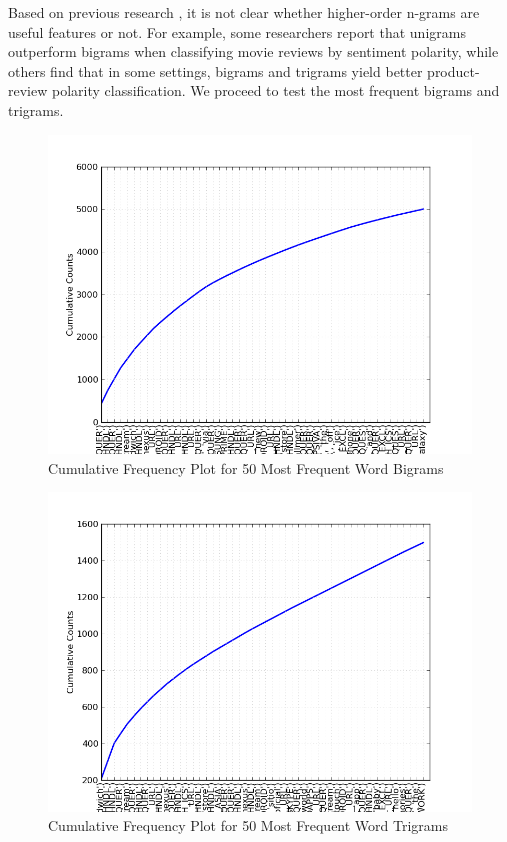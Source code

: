 Based on previous research \cite{survey}, it is not clear whether higher-order n-grams are useful features or not.
For example, some researchers report that unigrams outperform bigrams when classifying movie reviews by sentiment polarity,
while others find that in some settings, bigrams and trigrams yield better product-review polarity classification.
We proceed to test the most frequent bigrams and trigrams.

\begin{figure}[h]
\centering
\includegraphics[width=\textwidth]{img/fdist-bigrams.png}
\caption{Cumulative Frequency Plot for 50 Most Frequent Word Bigrams}
\label{fig:bigrams}
\end{figure}

\begin{figure}[h]
\centering
\includegraphics[width=\textwidth]{img/fdist-trigrams.png}
\caption{Cumulative Frequency Plot for 50 Most Frequent Word Trigrams}
\label{fig:trigrams}
\end{figure}

